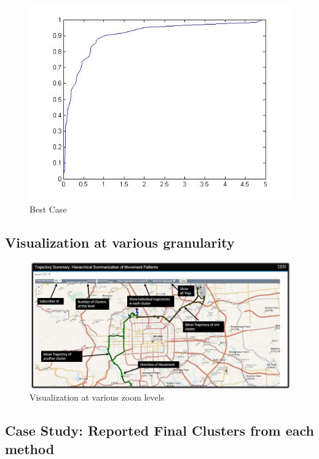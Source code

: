 \begin{figure}
\centering     
\includegraphics[scale=0.4]{figs/best_nextLoc.jpg}
\caption{Best Case}
\label{fig:best_nextLoc}  
\end{figure} 


\subsection{Visualization at various granularity }

\begin{figure}
\centering   
\includegraphics[scale=0.6]{figs/demo.jpg}
\caption{Visualization at various zoom levels}
\label{fig:demo}  
\end{figure}

\subsection{Case Study: Reported Final Clusters from each method}

